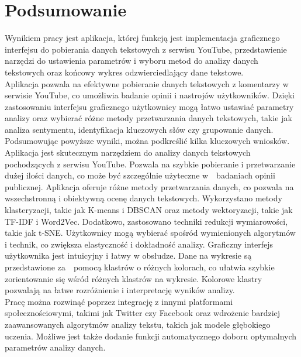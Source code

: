 \chapter*{Podsumowanie}

Wynikiem pracy jest aplikacja, której funkcją jest implementacja graficznego interfejsu do pobierania danych tekstowych z serwisu YouTube, przedstawienie narzędzi do ustawienia parametrów i wyboru metod do analizy danych tekstowych oraz końcowy wykres odzwierciedlający dane tekstowe.\\

Aplikacja pozwala na efektywne pobieranie danych tekstowych z komentarzy w serwisie YouTube, co umożliwia badanie opinii i nastrojów użytkowników. Dzięki zastosowaniu interfejsu graficznego użytkownicy mogą łatwo ustawiać parametry analizy oraz wybierać różne metody przetwarzania danych tekstowych, takie jak analiza sentymentu, identyfikacja kluczowych słów czy grupowanie danych.\\

Podsumowując powyższe wyniki, można podkreślić kilka kluczowych wniosków. Aplikacja jest skutecznym narzędziem do analizy danych tekstowych pochodzących z serwisu YouTube. Pozwala na szybkie pobieranie i przetwarzanie dużej ilości danych, co może być szczególnie użyteczne w~~badaniach opinii publicznej. Aplikacja oferuje różne metody przetwarzania danych, co pozwala na wszechstronną i obiektywną ocenę danych tekstowych. Wykorzystano metody klasteryzacji, takie jak K-means i DBSCAN oraz metody wektoryzacji, takie jak TF-IDF i Word2Vec. Dodatkowo, zastosowano techniki redukcji wymiarowości, takie jak t-SNE. Użytkownicy mogą wybierać spośród wymienionych algorytmów i technik, co zwiększa elastyczność i dokładność analizy. Graficzny interfejs użytkownika jest intuicyjny i łatwy w obsłudze. Dane na wykresie są przedstawione za~~pomocą klastrów o różnych kolorach, co ułatwia szybkie zorientowanie się wśród różnych klastrów na wykresie. Kolorowe klastry pozwalają na łatwe rozróżnienie i interpretację wyników analizy.\\

Pracę można rozwinąć poprzez integrację z innymi platformami społecznościowymi, takimi jak Twitter czy Facebook oraz wdrożenie bardziej zaawansowanych algorytmów analizy tekstu, takich jak modele głębokiego uczenia. Możliwe jest także dodanie funkcji automatycznego doboru optymalnych parametrów analizy danych.\\